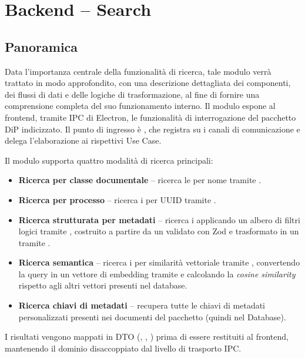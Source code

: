 \section{Backend – Search}

\subsection{Panoramica}

Data l'importanza centrale della funzionalità di ricerca, tale modulo verrà trattato in modo approfondito, con una descrizione dettagliata dei componenti, 
dei flussi di dati e delle logiche di trasformazione, al fine di fornire una comprensione completa del suo funzionamento interno.
Il modulo espone al frontend, tramite IPC di Electron, le funzionalità di interrogazione del pacchetto DiP indicizzato.
Il punto di ingresso è , che registra su  i canali di comunicazione e delega l'elaborazione ai rispettivi Use Case.

Il modulo supporta quattro modalità di ricerca principali:

\begin{itemize}
    \item \textbf{Ricerca per classe documentale} – ricerca le  per nome tramite .
    \item \textbf{Ricerca per processo} – ricerca i  per UUID tramite .
    \item \textbf{Ricerca strutturata per metadati} – ricerca i  applicando un albero di filtri logici tramite 
    , costruito a partire da un  validato con Zod e trasformato in un 
     tramite .
    \item \textbf{Ricerca semantica} – ricerca i  per similarità vettoriale tramite , 
    convertendo la query in un vettore di embedding tramite  e calcolando la \textit{cosine similarity} 
    rispetto agli altri vettori presenti nel database.
    \item \textbf{Ricerca chiavi di metadati} – recupera tutte le chiavi di metadati personalizzati presenti nei documenti del pacchetto (quindi nel Database).
\end{itemize}

I risultati vengono mappati in DTO (, , ) 
prima di essere restituiti al frontend, mantenendo il dominio disaccoppiato dal livello di trasporto IPC.

